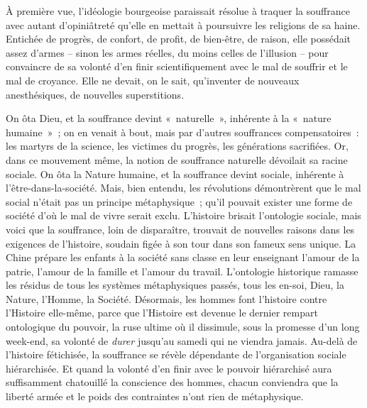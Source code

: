 \documentclass[french,twoside]{book} %
\begin{document}
\noindent À première vue, l’idéologie bourgeoise paraissait résolue à traquer la souffrance avec autant d’opiniâtreté qu’elle en mettait à poursuivre les religions de sa haine. Entichée de progrès, de confort, de profit, de bien-être, de raison, elle possédait assez d’armes – sinon les armes réelles, du moins celles de l’illusion – pour convaincre de sa volonté d’en finir scientifiquement avec le mal de souffrir et le mal de croyance. Elle ne devait, on le sait, qu’inventer de nouveaux anesthésiques, de nouvelles superstitions.\par
On ôta Dieu, et la souffrance devint « naturelle », inhérente à la « nature humaine » ; on en venait à bout, mais par d’autres souffrances compensatoires : les martyrs de la science, les victimes du progrès, les générations sacrifiées. Or, dans ce mouvement même, la notion de souffrance naturelle dévoilait sa racine sociale. On ôta la Nature humaine, et la souffrance devint sociale, inhérente à l’être-dans-la-société. Mais, bien entendu, les révolutions démontrèrent que le mal social n’était pas un principe métaphysique ; qu’il pouvait exister une forme de société d’où le mal de vivre serait exclu. L’histoire brisait l’ontologie sociale, mais voici que la souffrance, loin de disparaître, trouvait de nouvelles raisons dans les exigences de l’histoire, soudain figée à son tour dans son fameux sens unique. La Chine prépare les enfants à la société sans classe en leur enseignant l’amour de la patrie, l’amour de la famille et l’amour du travail. L’ontologie historique ramasse les résidus de tous les systèmes métaphysiques passés, tous les en-soi, Dieu, la Nature, l’Homme, la Société. Désormais, les hommes font l’histoire contre l’Histoire elle-même, parce que l’Histoire est devenue le dernier rempart ontologique du pouvoir, la ruse ultime où il dissimule, sous la promesse d’un long week-end, sa volonté de \emph{durer} jusqu’au samedi qui ne viendra jamais. Au-delà de l’histoire fétichisée, la souffrance se révèle dépendante de l’organisation sociale hiérarchisée. Et quand la volonté d’en finir avec le pouvoir hiérarchisé aura suffisamment chatouillé la conscience des hommes, chacun conviendra que la liberté armée et le poids des contraintes n’ont rien de métaphysique.
\end{document}
